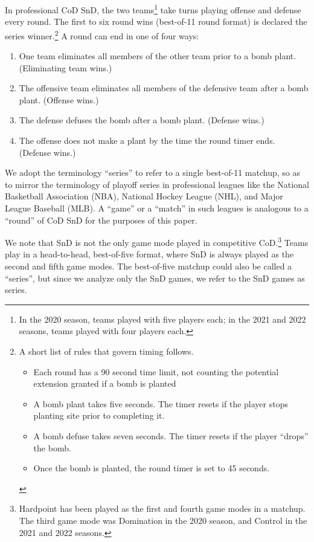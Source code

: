 \documentclass{article}
\providecommand{\tightlist}{%
  \setlength{\itemsep}{0pt}\setlength{\parskip}{0pt}}
\begin{document}
In professional CoD SnD, the two teams\footnote{In the 2020 season,
  teams played with five players each; in the 2021 and 2022 seasons,
  teams played with four players each.} take turns playing offense and
defense every round. The first to six round wins (best-of-11 round
format) is declared the series winner.\footnote{A short list of rules
  that govern timing follows.

  \begin{itemize}
  \tightlist
  \item
    Each round has a 90 second time limit, not counting the potential
    extension granted if a bomb is planted
  \item
    A bomb plant takes five seconds. The timer resets if the player
    stops planting site prior to completing it.
  \item
    A bomb defuse takes seven seconds. The timer resets if the player
    ``drops'' the bomb.
  \item
    Once the bomb is planted, the round timer is set to 45 seconds.
  \end{itemize}} A round can end in one of four ways:

\begin{enumerate}
\def\labelenumi{\arabic{enumi}.}
\tightlist
\item
  One team eliminates all members of the other team prior to a bomb
  plant. (Eliminating team wins.)
\item
  The offensive team eliminates all members of the defensive team after
  a bomb plant. (Offense wins.)
\item
  The defense defuses the bomb after a bomb plant. (Defense wins.)
\item
  The offense does not make a plant by the time the round timer ends.
  (Defense wins.)
\end{enumerate}

We adopt the terminology ``series'' to refer to a single best-of-11
matchup, so as to mirror the terminology of playoff series in
professional leagues like the National Basketball Association (NBA),
National Hockey League (NHL), and Major League Baseball (MLB). A
``game'' or a ``match'' in such leagues is analogous to a ``round'' of
CoD SnD for the purposes of this paper.

We note that SnD is not the only game mode played in competitive
CoD.\footnote{Hardpoint has been played as the first and fourth game
  modes in a matchup. The third game mode was Domination in the 2020
  season, and Control in the 2021 and 2022 seasons.} Teams play in a
head-to-head, best-of-five format, where SnD is always played as the
second and fifth game modes. The best-of-five matchup could also be
called a ``series'', but since we analyze only the SnD games, we refer
to the SnD games as series.
\end{document}
